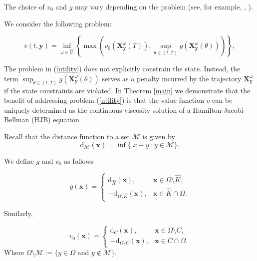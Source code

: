 \documentclass[]{interact}
\theoremstyle{plain}%
\theoremstyle{definition}
\theoremstyle{remark}
\begin{document}
The choice of \( v_0 \) and \( g \) may vary depending on the problem (see, for  example, \cite{altarovici2013general}, \cite{assellaou2018value}).

We consider the following problem:

\begin{equation}\label{utility}
v(t, \mathbf{y}) = \inf_{\omega \in \hat{\mathcal{U}}}\left\{ \max \left(  v_0(\mathbf{X}_{\mathbf{y}}^\omega(T)), \sup_{\theta \in (t, T)} g\left(\mathbf{X}_{\mathbf{y}}^\omega(\theta)\right) \right)  \right\},
\end{equation}

The problem in (\ref{utility}) does not explicitly constrain the state. Instead, the term $\sup_{\theta \in (t, T)} g\left(\mathbf{X}_{\mathbf{y}}^\omega(\theta)\right)$ serves as a penalty incurred by the trajectory \( \mathbf{X}_{\mathbf{y}}^\omega \) if the state constraints are violated. In Theorem \ref{main} we demonstrate that the benefit of addressing problem (\ref{utility}) is that the value function \( v \) can be uniquely determined as the continuous viscosity solution of a Hamilton-Jacobi-Bellman (HJB) equation.

Recall that the distance function to a set $\mathcal{M}$ is given by 
\[
\mathrm{d}_{\mathcal{M}}(\mathbf{x}) = \inf\{ |x - y| : y \in \mathcal{M} \}.
\]

We define \( g \) and $v_{0}$ as follows

\begin{equation}\label{g1}
g(\mathbf{x}) = 
\begin{cases} 
\mathrm{d}_{\hat{K}}(\mathbf{x}), & \mathbf{x} \in \Omega \setminus \hat{K}, \\ 
-\mathrm{d}_{\Omega \setminus \hat{K}}(\mathbf{x}), & \mathbf{x} \in \hat{K} \cap \Omega.
\end{cases}
\end{equation}

Similarly, 

\begin{equation}\label{v01}
v_{0}(\mathbf{x}) = 
\begin{cases} 
\mathrm{d}_{C}(\mathbf{x}), & \mathbf{x} \in \Omega \setminus C, \\ 
-\mathrm{d}_{\Omega \setminus C}(\mathbf{x}), & \mathbf{x} \in C \cap \Omega.

\end{cases}
\end{equation}
Where $\Omega\setminus \mathcal{M}:=\{y\in \Omega \mbox{ and } y\notin \mathcal{M} \}$.
\end{document}
